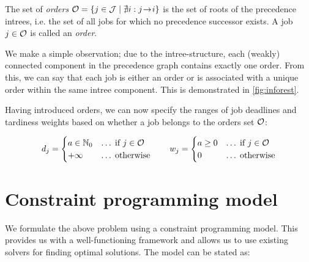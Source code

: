 The set of \emph{orders} $\mathcal{O} = \{ j \in \mathcal{J} \mid \nexists i : j \hspace{-0.2em} \rightarrow \hspace{-0.2em} i \}$
is the set of roots of the precedence intrees,
i.e. the set of all jobs for which no precedence successor exists.
A job $j \in \mathcal{O}$ is called an \emph{order}.

We make a simple observation; due to the intree-structure,
each (weakly) connected component in the precedence graph contains exactly one order.
From this, we can say that each job is either an order
or is associated with a unique order within the same intree component.
This is demonstrated in \cref{fig:inforest}.

Having introduced orders, we can now specify the ranges of job deadlines and tardiness weights
based on whether a job belongs to the orders set $\mathcal{O}$:

$$
d_{j} = \begin{cases}
    a \in \mathbb{N}_0  &\dots\;   \text{if $j \in \mathcal{O}$} \\
    +\infty       &\dots\;   \text{otherwise}
\end{cases}
\qquad
w_{j} = \begin{cases}
    a \geq 0  &\dots\;   \text{if $j     \in \mathcal{O}$} \\
    0         &\dots\;   \text{otherwise}
\end{cases}
$$

\section{Constraint programming model} \label{sec:problem-statement/constraint-programming-model}

We formulate the above problem using a constraint programming model.
This provides us with a well-functioning framework
and allows us to use existing solvers for finding optimal solutions.
The model can be stated as:

